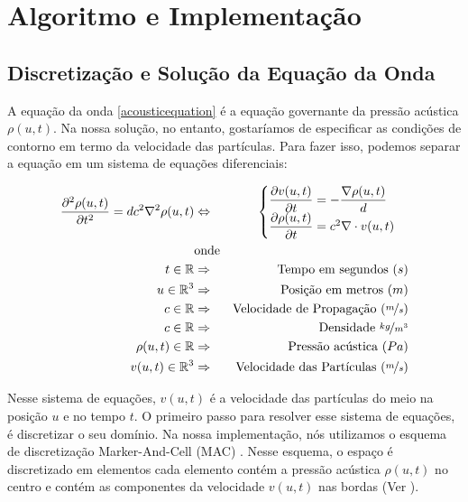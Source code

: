 \chapter{Algoritmo e Implementação}

\section {Discretização e Solução da Equação da Onda}

A equação da onda \eqref{acousticequation} é a equação governante da pressão acústica $\rho(u, t)$. Na nossa solução, no entanto, gostaríamos de especificar as condições de contorno em termo da velocidade das partículas. Para fazer isso, podemos separar a equação em um sistema de equações diferenciais:

\begin{eqnarray} \label{eq:wave_equation_velocity}
	\frac{\partial^2 \rho(u, t)}{\partial t^2} = dc^2 \nabla^2 \rho(u, t)
	&\Leftrightarrow&
	\begin{cases}
		\dfrac{\partial v(u, t)}{\partial t} = -\dfrac{\nabla \rho(u, t)}{d}\\
		\dfrac{\partial \rho(u, t)}{\partial t} = c^2 \nabla \cdot v(u, t)	
	\end{cases}\\
	&\text{onde}&\nonumber\\
	t \in \mathbb{R} &\Rightarrow& \text{Tempo em segundos }(s) \nonumber\\
	u \in \mathbb{R}^3 &\Rightarrow& \text{Posição em metros }(m) \nonumber\\
	c \in \mathbb{R} &\Rightarrow& \text{Velocidade de Propagação }(\nicefrac{m}{s}) \nonumber\\
	c \in \mathbb{R} &\Rightarrow& \text{Densidade } \nicefrac{kg}{m^3} \nonumber\\
	\rho(u, t) \in \mathbb{R} &\Rightarrow& \text{Pressão acústica }(Pa) \nonumber\\
	v(u, t) \in \mathbb{R}^3 &\Rightarrow& \text{Velocidade das Partículas } (\nicefrac{m}{s})\nonumber
\end{eqnarray}

Nesse sistema de equações, $v(u, t)$ é a velocidade das partículas do meio na posição $u$ e no tempo $t$. O primeiro passo para resolver esse sistema de equações, é discretizar o seu domínio. Na nossa implementação, nós utilizamos o esquema de discretização Marker-And-Cell (MAC) \cite{welch1966mac}. Nesse esquema, o espaço é discretizado em elementos cada elemento contém a pressão acústica $\rho(u, t)$ no centro e contém as componentes da velocidade $v(u, t)$ nas bordas (Ver ).

